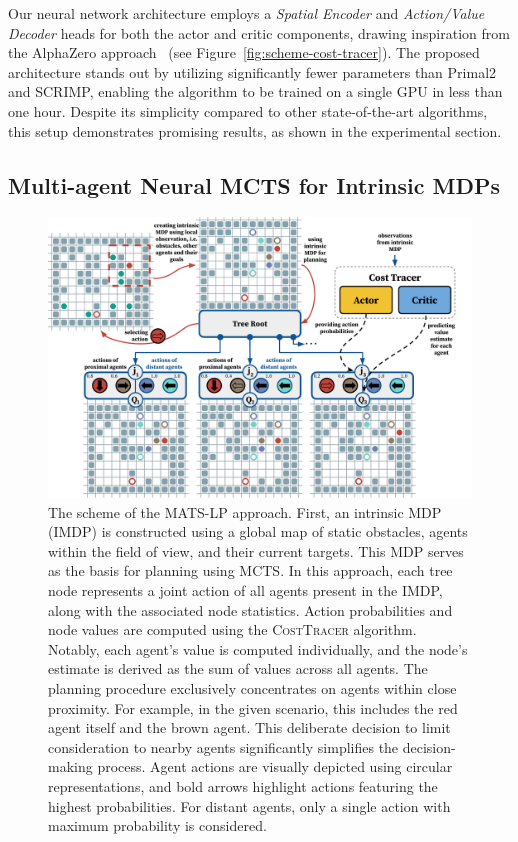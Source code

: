 \documentclass[letterpaper]{article} %
\begin{document}
Our neural network architecture employs a \textit{Spatial Encoder} and \textit{Action/Value Decoder} heads for both the actor and critic components, drawing inspiration from the AlphaZero approach~\cite{silver2017mastering} (see Figure~\ref{fig:scheme-cost-tracer}). The proposed architecture stands out by utilizing significantly fewer parameters than Primal2 and SCRIMP, enabling the algorithm to be trained on a single GPU in less than one hour. 
Despite its simplicity compared to other state-of-the-art algorithms, this setup demonstrates promising results, as shown in the experimental section.

\subsection{Multi-agent Neural MCTS for Intrinsic MDPs}

\begin{figure}[ht!]
    \centering
    \includegraphics[width=1.0\textwidth]{figures/03-main-scheme.pdf}
    \caption{
The scheme of the \textsc{MATS-LP} approach. First, an intrinsic MDP (IMDP) is constructed using a global map of static obstacles, agents within the field of view, and their current targets. This MDP serves as the basis for planning using MCTS. In this approach, each tree node represents a joint action of all agents present in the IMDP, along with the associated node statistics. Action probabilities and node values are computed using the \textsc{CostTracer} algorithm. Notably, each agent's value is computed individually, and the node's estimate is derived as the sum of values across all agents.
The planning procedure exclusively concentrates on agents within close proximity. For example, in the given scenario, this includes the red agent itself and the brown agent. This deliberate decision to limit consideration to nearby agents significantly simplifies the decision-making process. Agent actions are visually depicted using circular representations, and bold arrows highlight actions featuring the highest probabilities. For distant agents, only a single action with maximum probability is considered.
}
    \label{fig:mmcts}

\end{figure}
\end{document}

